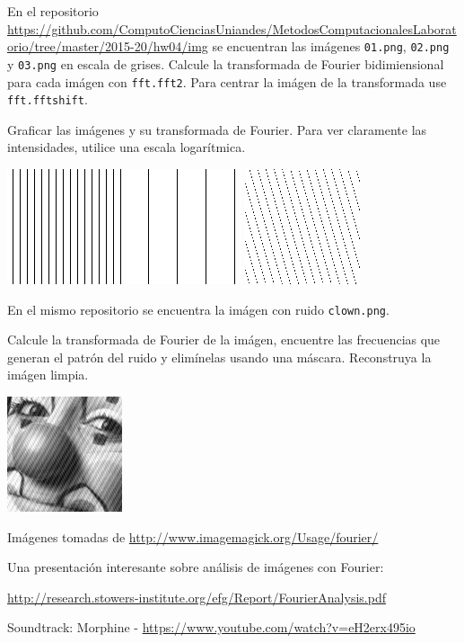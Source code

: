 \documentclass[11pt,letterpaper]{exam}
\begin{document}
\begin{questions}


En el repositorio 
\url{https://github.com/ComputoCienciasUniandes/MetodosComputacionalesLaboratorio/tree/master/2015-20/hw04/img} 
se encuentran las imágenes \verb"01.png", \verb"02.png" y \verb"03.png" 
en escala de grises. 
Calcule la transformada de Fourier bidimiensional para cada imágen con
\verb"fft.fft2".
Para centrar la imágen de la transformada use \verb"fft.fftshift".

Graficar las imágenes y su transformada de Fourier. Para ver claramente 
las intensidades, utilice una escala logarítmica.

\includegraphics{img/01} \includegraphics{img/02} \includegraphics{img/03} 


En el mismo repositorio se encuentra la imágen con ruido \verb"clown.png".

Calcule la transformada de Fourier de la imágen, encuentre las frecuencias
que generan el patrón del ruido y elimínelas usando una máscara.
Reconstruya la imágen limpia.

\includegraphics{img/clown}

\end{questions}

Imágenes tomadas de \url{http://www.imagemagick.org/Usage/fourier/}

Una presentación interesante sobre análisis de imágenes con Fourier:

\url{http://research.stowers-institute.org/efg/Report/FourierAnalysis.pdf}

Soundtrack: Morphine - \url{https://www.youtube.com/watch?v=eH2erx495io}
\end{document}
